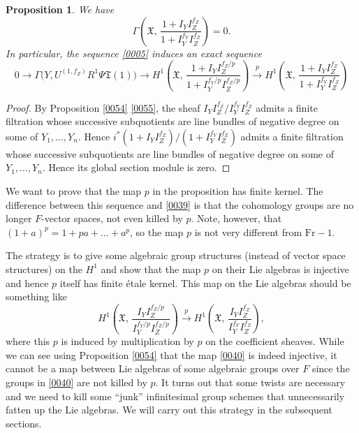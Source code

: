 \documentclass{amsart}
\newtheorem{Prop}[Thm]{Proposition}
\theoremstyle{remark}
\numberwithin{equation}{section}
\newcommand{\Frob}{\mathrm{Fr}}
\begin{document}
\begin{Prop} \label{0016}
	We have
		\[
				\Gamma \left(
					\mathfrak{X},\,
					\frac{
						1 + I_{Y} I_{Z}^{f_{Z}}
					}{
						1 + I_{Y}^{f_{Y}} I_{Z}^{f_{Z}}
					}
				\right)
			=
				0.
		\]
	In particular, the sequence \eqref{0005} induces an exact sequence
		\[
				0
			\to
				\Gamma \bigl(
					Y,
					U^{(1, f_{Z})} R^{1} \Psi \mathfrak{T}(1)
				\bigr)
			\to
				H^{1} \left(
					\mathfrak{X},\,
					\frac{
						1 + I_{Y} I_{Z}^{f_{Z} / p}
					}{
						1 + I_{Y}^{f_{Y} / p} I_{Z}^{f_{Z} / p}
					}
				\right)
			\stackrel{p}{\to}
				H^{1} \left(
					\mathfrak{X},\,
					\frac{
						1 + I_{Y} I_{Z}^{f_{Z}}
					}{
						1 + I_{Y}^{f_{Y}} I_{Z}^{f_{Z}}
					}
				\right)
		\]
\end{Prop}

\begin{proof}
	By Proposition \ref{0054} \eqref{0055}, the sheaf
	$I_{Y} I_{Z}^{f_{Z}} / I_{Y}^{f_{Y}} I_{Z}^{f_{Z}}$
	admits a finite filtration whose successive subquotients are
	line bundles of negative degree on some of $Y_{1}, \dots, Y_{n}$.
	Hence $i^{\ast} (1 + I_{Y} I_{Z}^{f_{Z}}) / (1 + I_{Y}^{f_{Y}} I_{Z}^{f_{Z}})$
	admits a finite filtration whose successive subquotients are
	line bundles of negative degree on some of $Y_{1}, \dots, Y_{n}$.
	Hence its global section module is zero.
\end{proof}

We want to prove that the map $p$ in the proposition has finite kernel.
The difference between this sequence and \eqref{0039}
is that the cohomology groups are no longer $F$-vector spaces,
not even killed by $p$.
Note, however, that $(1 + a)^{p} = 1 + p a + \dots + a^{p}$,
so the map $p$ is not very different from $\Frob - 1$.

The strategy is to give some algebraic group structures (instead of vector space structures) on the $H^{1}$
and show that the map $p$ on their Lie algebras is injective
and hence $p$ itself has finite \'etale kernel.
This map on the Lie algebras should be something like
	\begin{equation} \label{0040}
			H^{1} \left(
				\mathfrak{X},\,
				\frac{
					I_{Y} I_{Z}^{f_{Z} / p}
				}{
					I_{Y}^{f_{Y} / p} I_{Z}^{f_{Z} / p}
				}
			\right)
		\stackrel{p}{\to}
			H^{1} \left(
				\mathfrak{X},\,
				\frac{
					I_{Y} I_{Z}^{f_{Z}}
				}{
					I_{Y}^{f_{Y}} I_{Z}^{f_{Z}}
				}
			\right),
	\end{equation}
where this $p$ is induced by multiplication by $p$ on the coefficient sheaves.
While we can see using Proposition \ref{0054} that the map \eqref{0040} is indeed injective,
it cannot be a map between Lie algebras of some algebraic groups over $F$
since the groups in \eqref{0040} are not killed by $p$.
It turns out that some twists are necessary
and we need to kill some ``junk'' infinitesimal group schemes
that unnecessarily fatten up the Lie algebras.
We will carry out this strategy in the subsequent sections.
\end{document}
